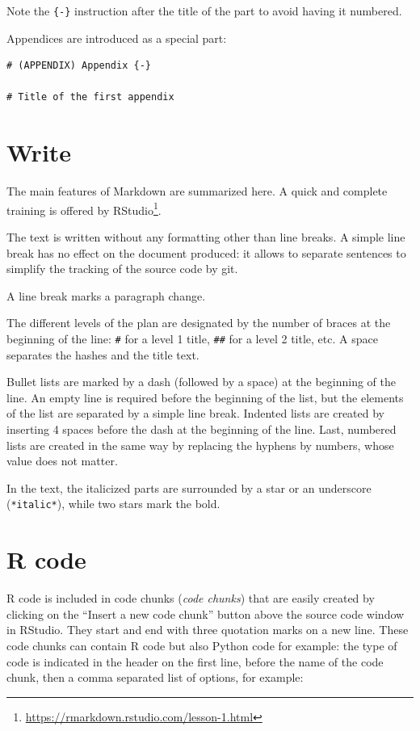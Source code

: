 \documentclass[
  12pt,
  american,
  a4paper,
  extrafontsizes,onecolumn,openright
  ]{memoir}
\begin{document}
Note the \texttt{\{-\}} instruction after the title of the part to avoid having it numbered.

Appendices are introduced as a special part:

\begin{verbatim}
# (APPENDIX) Appendix {-} 

# Title of the first appendix
\end{verbatim}

\hypertarget{write}{%
\section{Write}\label{write}}

The main features of Markdown are summarized here.
A quick and complete training is offered by RStudio\footnote{\url{https://rmarkdown.rstudio.com/lesson-1.html}}.

The text is written without any formatting other than line breaks.
A simple line break has no effect on the document produced: it allows to separate sentences to simplify the tracking of the source code by git.

A line break marks a paragraph change.

The different levels of the plan are designated by the number of braces at the beginning of the line: \texttt{\#} for a level 1 title, \texttt{\#\#} for a level 2 title, etc.
A space separates the hashes and the title text.

Bullet lists are marked by a dash (followed by a space) at the beginning of the line.
An empty line is required before the beginning of the list, but the elements of the list are separated by a simple line break.
Indented lists are created by inserting 4 spaces before the dash at the beginning of the line.
Last, numbered lists are created in the same way by replacing the hyphens by numbers, whose value does not matter.

In the text, the italicized parts are surrounded by a star or an underscore (\texttt{*italic*}), while two stars mark the bold.

\hypertarget{r-code}{%
\section{R code}\label{r-code}}

R code is included in code chunks (\emph{code chunks}) that are easily created by clicking on the ``Insert a new code chunk'' button above the source code window in RStudio.
They start and end with three quotation marks on a new line.
These code chunks can contain R code but also Python code for example: the type of code is indicated in the header on the first line, before the name of the code chunk, then a comma separated list of options, for example:
\end{document}
